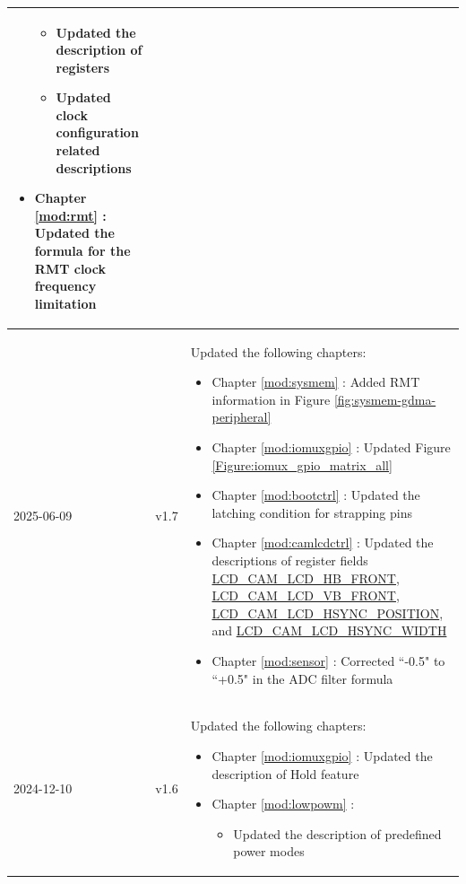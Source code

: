 \begin{longtable}[l]{ | m{2cm} | m{1.5cm} | m{12cm} | }
\begin{itemize}
            \begin{itemize}
                \item Updated the description of registers %
                \item Updated clock configuration related descriptions %
            \end{itemize}
        \item Chapter \ref{mod:rmt} \textit{\nameref{mod:rmt}}: Updated the formula for the RMT clock frequency limitation %
    \end{itemize}
    \\\hline
    2025-06-09 & v1.7 &
    Updated the following chapters:
        \begin{itemize}
            \item Chapter \ref{mod:sysmem} \textit{\nameref{mod:sysmem}}: Added RMT information in Figure \ref{fig:sysmem-gdma-peripheral} %
            \item Chapter \ref{mod:iomuxgpio} \textit{\nameref{mod:iomuxgpio}}: Updated Figure \ref {Figure:iomux_gpio_matrix_all} %
            \item Chapter \ref{mod:bootctrl} \textit{\nameref{mod:bootctrl}}: Updated the latching condition for strapping pins %
            \item Chapter \ref{mod:camlcdctrl} \textit{\nameref{mod:camlcdctrl}}: Updated the descriptions of register fields \hyperref[fielddesc:LCDCAMLCDHBFRONT]{LCD\_CAM\_LCD\_HB\_FRONT}, \hyperref[fielddesc:LCDCAMLCDVBFRONT]{LCD\_CAM\_LCD\_VB\_FRONT}, \hyperref[fielddesc:LCDCAMLCDHSYNCPOSITION]{LCD\_CAM\_LCD\_HSYNC\_POSITION}, and \hyperref[fielddesc:LCDCAMLCDHSYNCWIDTH]{LCD\_CAM\_LCD\_HSYNC\_WIDTH} %
            \item Chapter \ref{mod:sensor} \textit{\nameref{mod:sensor}}: Corrected ``-0.5" to ``+0.5" in the ADC filter formula %
        \end{itemize}
        \\\hline
    2024-12-10 & v1.6 &
    Updated the following chapters:
        \begin{itemize}
            \item Chapter \ref{mod:iomuxgpio} \textit{\nameref{mod:iomuxgpio}}: Updated the description of Hold feature %
            \item Chapter \ref{mod:lowpowm} \textit{\nameref{mod:lowpowm}}:
                \begin{itemize}
                    \item Updated the description of predefined power modes %

\end{itemize}
\end{itemize}
\end{longtable}
